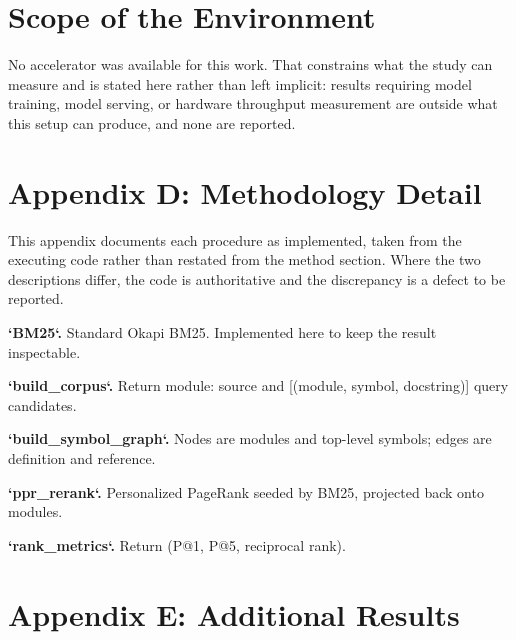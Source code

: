 \documentclass[10pt,twocolumn,letterpaper]{article}
\begin{document}
\section{Scope of the Environment}


No accelerator was available for this work. That constrains what the study can measure and is stated here rather than left implicit: results requiring model training, model serving, or hardware throughput measurement are outside what this setup can produce, and none are reported.




\section{Appendix D: Methodology Detail}


This appendix documents each procedure as implemented, taken from the executing code rather than restated from the method section. Where the two descriptions differ, the code is authoritative and the discrepancy is a defect to be reported.

\textbf{`BM25`.} Standard Okapi BM25. Implemented here to keep the result inspectable.

\textbf{`build\_corpus`.} Return {module: source} and [(module, symbol, docstring)] query candidates.

\textbf{`build\_symbol\_graph`.} Nodes are modules and top-level symbols; edges are definition and reference.

\textbf{`ppr\_rerank`.} Personalized PageRank seeded by BM25, projected back onto modules.

\textbf{`rank\_metrics`.} Return (P@1, P@5, reciprocal rank).




\section{Appendix E: Additional Results}
\end{document}
